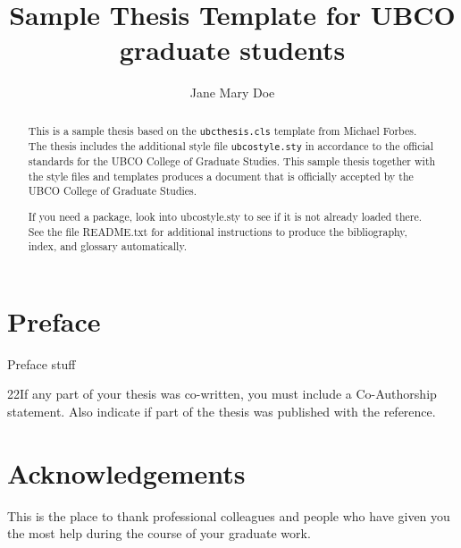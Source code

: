 \documentclass[msc,oneside]{ubcthesis}%
\title{Sample Thesis Template for UBCO graduate students}
\author{Jane Mary Doe} %
\begin{document}
\frontmatter                    %

\maketitle                      %

\begin{abstract}                %
This is a sample thesis based on the \texttt{ubcthesis.cls} template
from Michael Forbes. The thesis includes the additional style file
\texttt{ubcostyle.sty} in accordance to the official standards for
the UBCO College of Graduate Studies.
This sample thesis together with the style files and templates
produces a document that is officially accepted by the UBCO College of Graduate Studies. 

If you need a package, look into ubcostyle.sty to see if it is not already loaded there. 
See the file README.txt for additional instructions to produce the bibliography, index, and glossary automatically.
\end{abstract}

\chapter{Preface}
Preface stuff

22If any part of your thesis was co-written, you must include a
Co-Author\-ship statement. Also indicate if part of the thesis was published with the reference.

\newpage
{} \label{tableofcontent}%
\tableofcontents                %
\newpage 
{} \label{listoftab}%
\listoftables                   %
\newpage
{} \label{listoffig}%
\listoffigures                  %


\chapter{Acknowledgements}      %
This is the place to thank professional colleagues and people who have
given you the most help during the course of your graduate work.
\end{document}
